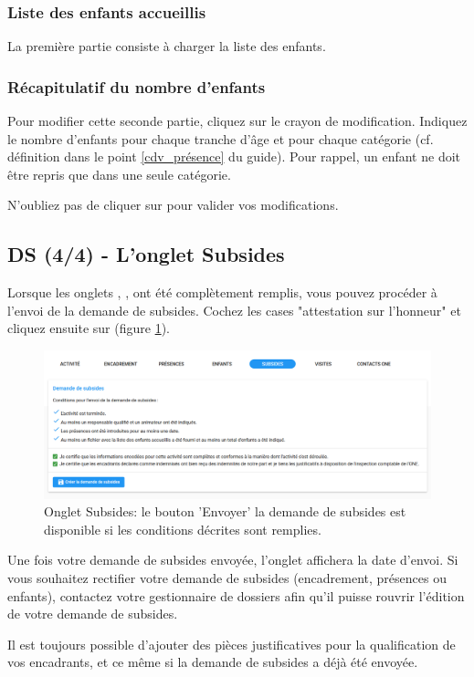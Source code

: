 \subsubsection{Liste des enfants accueillis}
La première partie consiste à charger la liste des enfants. 


\subsubsection{Récapitulatif du nombre d'enfants}
Pour modifier cette seconde partie, cliquez sur le crayon de modification. Indiquez le nombre d'enfants pour chaque tranche d'âge et pour chaque catégorie (cf. définition dans le point \ref{cdv_présence} du guide). Pour rappel, un enfant ne doit être repris que dans une seule catégorie.

N'oubliez pas de cliquer sur  pour valider vos modifications. 


\subsection{DS (4/4) - L'onglet Subsides}
Lorsque les onglets , ,  ont été complètement remplis, vous pouvez procéder à l'envoi de la demande de subsides. Cochez les cases "attestation sur l'honneur" et cliquez ensuite sur  (figure \ref{fig:cdv_subsides}). 

\begin{figure}[h]
    \centering
    \includegraphics[width=12.5cm]{Images/cdv/cdv-ds-subsides.png}
    \caption{Onglet Subsides: le bouton 'Envoyer' la demande de subsides est disponible si les conditions décrites sont remplies.}
    \label{fig:cdv_subsides}
\end{figure}


Une fois votre demande de subsides envoyée, l'onglet  affichera la date d'envoi. Si vous souhaitez rectifier votre demande de subsides (encadrement, présences ou enfants), contactez votre gestionnaire de dossiers afin qu'il puisse rouvrir l'édition de votre demande de subsides. 
\begin{information}
Il est toujours possible d'ajouter des pièces justificatives pour la qualification de vos encadrants, et ce même si la demande de subsides a déjà été envoyée.
\end{information}